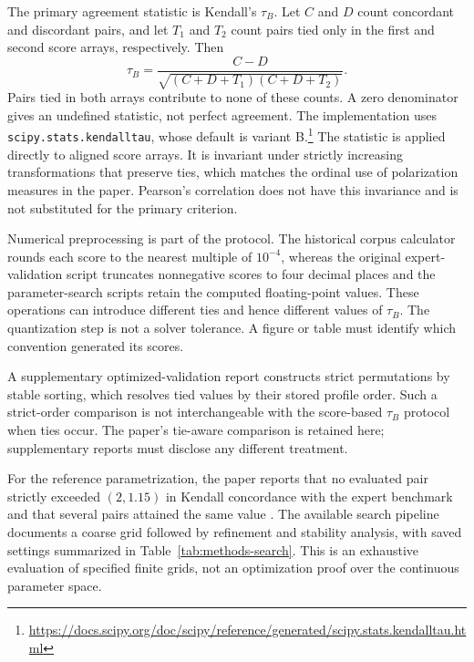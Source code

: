 \documentclass{article}
\theoremstyle{plain}
\theoremstyle{remark}
\begin{document}
The primary agreement statistic is Kendall's $\tau_B$. Let $C$ and $D$ count concordant and discordant pairs, and let $T_1$ and $T_2$ count pairs tied only in the first and second score arrays, respectively. Then
\begin{equation}\label{eq:methods-kendall}
\tau_B=\frac{C-D}{\sqrt{(C+D+T_1)(C+D+T_2)}}.
\end{equation}
Pairs tied in both arrays contribute to none of these counts. A zero denominator gives an undefined statistic, not perfect agreement. The implementation uses \texttt{scipy.stats.kendalltau}, whose default is variant B.\footnote{\url{https://docs.scipy.org/doc/scipy/reference/generated/scipy.stats.kendalltau.html}} The statistic is applied directly to aligned score arrays. It is invariant under strictly increasing transformations that preserve ties, which matches the ordinal use of polarization measures in the paper. Pearson's correlation does not have this invariance and is not substituted for the primary criterion.

Numerical preprocessing is part of the protocol. The historical corpus calculator rounds each score to the nearest multiple of $10^{-4}$, whereas the original expert-validation script truncates nonnegative scores to four decimal places and the parameter-search scripts retain the computed floating-point values. These operations can introduce different ties and hence different values of $\tau_B$. The quantization step is not a solver tolerance. A figure or table must identify which convention generated its scores.

A supplementary optimized-validation report constructs strict permutations by stable sorting, which resolves tied values by their stored profile order. Such a strict-order comparison is not interchangeable with the score-based $\tau_B$ protocol when ties occur. The paper's tie-aware comparison is retained here; supplementary reports must disclose any different treatment.

For the reference parametrization, the paper reports that no evaluated pair strictly exceeded $(2,1.15)$ in Kendall concordance with the expert benchmark and that several pairs attained the same value \citep{aranda2026mec}. The available search pipeline documents a coarse grid followed by refinement and stability analysis, with saved settings summarized in Table~\ref{tab:methods-search}. This is an exhaustive evaluation of specified finite grids, not an optimization proof over the continuous parameter space.
\end{document}
